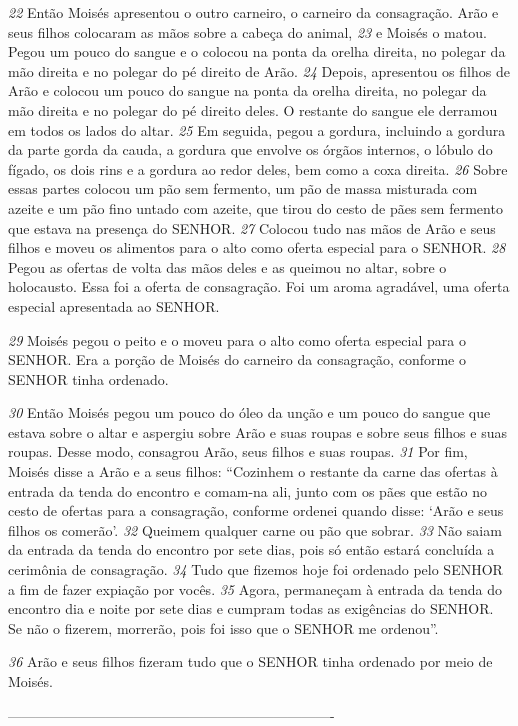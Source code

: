 \smallskip
\textit{\tiny 22}
Então Moisés apresentou o outro carneiro, o carneiro da consagração. Arão e
seus filhos colocaram as mãos sobre a cabeça do animal, 
\textit{\tiny 23}
e Moisés o matou.
Pegou um pouco do sangue e o colocou na ponta da orelha direita, no polegar da
mão direita e no polegar do pé direito de Arão. 
\textit{\tiny 24}
Depois, apresentou os filhos de
Arão e colocou um pouco do sangue na ponta da orelha direita, no polegar da mão
direita e no polegar do pé direito deles. O restante do sangue ele derramou em
todos os lados do altar.
\textit{\tiny 25}
Em seguida, pegou a gordura, incluindo a gordura da parte gorda da cauda, a
gordura que envolve os órgãos internos, o lóbulo do fígado, os dois rins e a
gordura ao redor deles, bem como a coxa direita. 
\textit{\tiny 26}
Sobre essas partes colocou um
pão sem fermento, um pão de massa misturada com azeite e um pão fino untado
com azeite, que tirou do cesto de pães sem fermento que estava na presença do
SENHOR. 
\textit{\tiny 27}
Colocou tudo nas mãos de Arão e seus filhos e moveu os alimentos para
o alto como oferta especial para o SENHOR. 
\textit{\tiny 28}
Pegou as ofertas de volta das mãos
deles e as queimou no altar, sobre o holocausto. Essa foi a oferta de consagração.
Foi um aroma agradável, uma oferta especial apresentada ao SENHOR. 

\smallskip
\textit{\tiny 29}
Moisés
pegou o peito e o moveu para o alto como oferta especial para o SENHOR. Era a
porção de Moisés do carneiro da consagração, conforme o SENHOR tinha
ordenado.
   
\smallskip
\textit{\tiny 30}
Então Moisés pegou um pouco do óleo da unção e um pouco do sangue que
estava sobre o altar e aspergiu sobre Arão e suas roupas e sobre seus filhos e suas
roupas. Desse modo, consagrou Arão, seus filhos e suas roupas.
\textit{\tiny 31}
Por fim, Moisés disse a Arão e a seus filhos: “Cozinhem o restante da carne
das ofertas à entrada da tenda do encontro e comam-na ali, junto com os pães que
estão no cesto de ofertas para a consagração, conforme ordenei quando disse:
‘Arão e seus filhos os comerão’. 
\textit{\tiny 32}
Queimem qualquer carne ou pão que sobrar.
\textit{\tiny 33}
Não saiam da entrada da tenda do encontro por sete dias, pois só então estará
concluída a cerimônia de consagração. 
\textit{\tiny 34}
Tudo que fizemos hoje foi ordenado
pelo SENHOR a fim de fazer expiação por vocês. 
\textit{\tiny 35}
Agora, permaneçam à entrada
da tenda do encontro dia e noite por sete dias e cumpram todas as exigências do
SENHOR. Se não o fizerem, morrerão, pois foi isso que o SENHOR me ordenou”.

\smallskip
\textit{\tiny 36}
Arão e seus filhos fizeram tudo que o SENHOR tinha ordenado por meio de
Moisés.



----------------------------------------------------------------------
